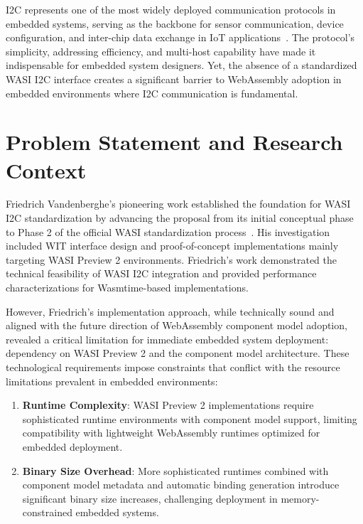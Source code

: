 I2C represents one of the most widely deployed communication protocols in embedded systems, serving as the backbone for sensor communication, device configuration, and inter-chip data exchange in IoT applications~\cite{i2c_specification}. The protocol's simplicity, addressing efficiency, and multi-host capability have made it indispensable for embedded system designers. Yet, the absence of a standardized WASI I2C interface creates a significant barrier to WebAssembly adoption in embedded environments where I2C communication is fundamental.

\section{Problem Statement and Research Context}
\label{sec:problem-statement}

Friedrich Vandenberghe's pioneering work established the foundation for WASI I2C standardization by advancing the proposal from its initial conceptual phase to Phase 2 of the official WASI standardization process~\cite{friedrich_thesis}. His investigation included WIT interface design and proof-of-concept implementations mainly targeting WASI Preview 2 environments. Friedrich's work demonstrated the technical feasibility of WASI I2C integration and provided performance characterizations for Wasmtime-based implementations.

However, Friedrich's implementation approach, while technically sound and aligned with the future direction of WebAssembly component model adoption, revealed a critical limitation for immediate embedded system deployment: dependency on WASI Preview 2 and the component model architecture. These technological requirements impose constraints that conflict with the resource limitations prevalent in embedded environments:

\begin{enumerate}
    \item \textbf{Runtime Complexity}: WASI Preview 2 implementations require sophisticated runtime environments with component model support, limiting compatibility with lightweight WebAssembly runtimes optimized for embedded deployment.
    
    \item \textbf{Binary Size Overhead}: More sophisticated runtimes combined with component model metadata and automatic binding generation introduce significant binary size increases, challenging deployment in memory-constrained embedded systems.
\end{enumerate}

